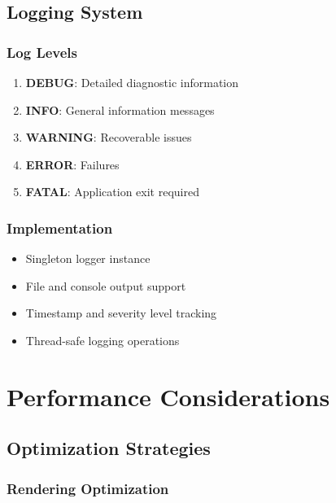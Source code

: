 \documentclass[12pt,a4paper,oneside,openany]{report}
\begin{document}
\newpage
\section{Logging System}

\subsection{Log Levels}

\begin{enumerate}
	\item \textbf{DEBUG}: Detailed diagnostic information
	\item \textbf{INFO}: General information messages
	\item \textbf{WARNING}: Recoverable issues
	\item \textbf{ERROR}: Failures
	\item \textbf{FATAL}: Application exit required
\end{enumerate}

\subsection{Implementation}

\begin{itemize}
	\item Singleton logger instance
	\item File and console output support
	\item Timestamp and severity level tracking
	\item Thread-safe logging operations
\end{itemize}

\chapter{Performance Considerations}

\section{Optimization Strategies}

\subsection{Rendering Optimization}
\end{document}
